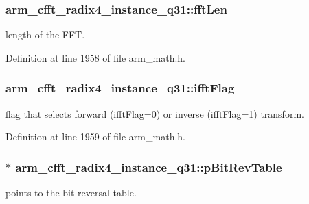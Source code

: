 \hypertarget{structarm__cfft__radix4__instance__q31_ab413d2a5d3f45fa187d93813bf3bf81b}{
\subsubsection[{fft\-Len}]{ arm\-\_\-cfft\-\_\-radix4\-\_\-instance\-\_\-q31\-::fft\-Len}}\label{structarm__cfft__radix4__instance__q31_ab413d2a5d3f45fa187d93813bf3bf81b}
length of the F\-F\-T. 

Definition at line 1958 of file arm\-\_\-math.\-h.

\hypertarget{structarm__cfft__radix4__instance__q31_adc0a62ba669ad2282ecbe43d5d96abab}{
\subsubsection[{ifft\-Flag}]{ arm\-\_\-cfft\-\_\-radix4\-\_\-instance\-\_\-q31\-::ifft\-Flag}}\label{structarm__cfft__radix4__instance__q31_adc0a62ba669ad2282ecbe43d5d96abab}
flag that selects forward (ifft\-Flag=0) or inverse (ifft\-Flag=1) transform. 

Definition at line 1959 of file arm\-\_\-math.\-h.

\hypertarget{structarm__cfft__radix4__instance__q31_a33a3bc774c97373261699463c05dfe54}{
\subsubsection[{p\-Bit\-Rev\-Table}]{$\ast$ arm\-\_\-cfft\-\_\-radix4\-\_\-instance\-\_\-q31\-::p\-Bit\-Rev\-Table}}\label{structarm__cfft__radix4__instance__q31_a33a3bc774c97373261699463c05dfe54}
points to the bit reversal table. 


